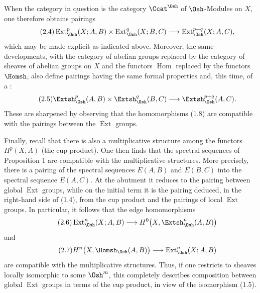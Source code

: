 When the category in question is the category $\Ccat^{\Osh}$ of
$\Osh$-Modules on $X$, one therefore obtains pairings
\begin{equation}\tag{2.4}
  \operatorname{Ext}_{\Osh}^{p}(X;A,B)
  \times\operatorname{Ext}_{\Osh}^{q}(X;B,C)
  \longrightarrow\operatorname{Ext}_{\Osh}^{p+q}(X;A,C),
\end{equation}
which may be made explicit as indicated above. Moreover, the same developments,
with the category of abelian groups replaced by the category of sheaves of
abelian groups on $X$ and the functors $\operatorname{Hom}$ replaced by the
functors $\Homsh$, also define pairings having the same formal properties and,
this time, of a :
\begin{equation}\tag{2.5}
  \Extsh_{\Osh}^{p}(A,B)\times\Extsh_{\Osh}^{q}(B,C)
  \longrightarrow\Extsh_{\Osh}^{p+q}(A,C).
\end{equation}
These are sharpened by observing that the homomorphisms (1.8) are compatible
with the pairings between the $\operatorname{Ext}$ groups.

Finally, recall that there is also a multiplicative structure among the functors
$H^{p}(X,A)$ (the cup product). One then finds that the spectral sequences of
Proposition 1 are compatible with the multiplicative structures. More
precisely, there is a pairing of the spectral sequences $E(A,B)$ and $E(B,C)$
into the spectral sequence $E(A,C)$. At the abutment it reduces to the pairing
between global $\operatorname{Ext}$ groups, while on the initial term it is the
pairing deduced, in the right-hand side of (1.4), from the cup product and the
pairings of local $\operatorname{Ext}$ groups. In particular, it follows that
the edge homomorphisms
\begin{equation}\tag{2.6}
  \operatorname{Ext}_{\Osh}^{n}(X;A,B)
  \longrightarrow H^{0}\bigl(X,\Extsh_{\Osh}^{n}(A,B)\bigr)
\end{equation}
and
\begin{equation}\tag{2.7}
  H^{n}\bigl(X,\Homsh_{\Osh}(A,B)\bigr)
  \longrightarrow\operatorname{Ext}_{\Osh}^{n}(X;A,B)
\end{equation}
are compatible with the multiplicative structures. Thus, if one restricts to
sheaves locally isomorphic to some $\Osh^{m}$, this completely describes
composition between global $\operatorname{Ext}$ groups in terms of the cup
product, in view of the isomorphism (1.5).


